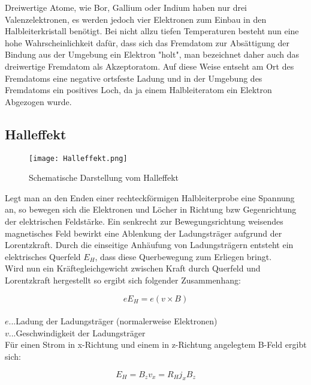 \documentclass[12pt, a4paper]{article}
\begin{document}
Dreiwertige Atome, wie Bor, Gallium oder Indium haben nur drei Valenzelektronen, es werden jedoch vier Elektronen zum Einbau in den Halbleiterkristall benötigt. Bei nicht allzu tiefen Temperaturen besteht nun eine hohe Wahrscheinlichkeit dafür, dass sich das Fremdatom zur Absättigung der Bindung aus der Umgebung ein Elektron "holt", man bezeichnet daher auch das dreiwertige Fremdatom als Akzeptoratom. Auf diese Weise entseht am Ort des Fremdatoms eine negative ortsfeste Ladung und in der Umgebung des Fremdatoms ein positives Loch, da ja einem Halbleiteratom ein Elektron Abgezogen wurde.



\subsection{Halleffekt}

\begin{figure}[!htpb]
    \centering
    \texttt{[image: Halleffekt.png]}
    \caption[Schematische Darstellung vom Halleffekt]
            {Schematische Darstellung vom Halleffekt}
    \label{fig:halleffekt}
\end{figure}
\FloatBarrier

Legt man an den Enden einer rechteckförmigen Halbleiterprobe eine Spannung an, so bewegen sich die Elektronen und Löcher in Richtung bzw Gegenrichtung der elektrischen Feldstärke. Ein senkrecht zur Bewegungsrichtung weisendes magnetisches Feld bewirkt eine Ablenkung der Ladungsträger aufgrund der Lorentzkraft. Durch die einseitige Anhäufung von Ladungsträgern entsteht ein elektrisches Querfeld $E_H$, dass diese Querbewegung zum Erliegen bringt.\\
Wird nun ein Kräftegleichgewicht zwischen Kraft durch Querfeld und Lorentzkraft hergestellt so ergibt sich folgender Zusammenhang:


\begin{equation}
    e E_H = e(v \times B)
    \label{eq_kraftgleich}
\end{equation}
\\
$e$...Ladung der Ladungsträger (normalerweise Elektronen)\\
$v$...Geschwindigkeit der Ladungsträger\\

Für einen Strom in x-Richtung und einem in z-Richtung angelegtem B-Feld ergibt sich:

\begin{equation}
    E_H = B_z v_x = R_H j_x B_z
    \label{eq_querfeld}
\end{equation}
\end{document}
